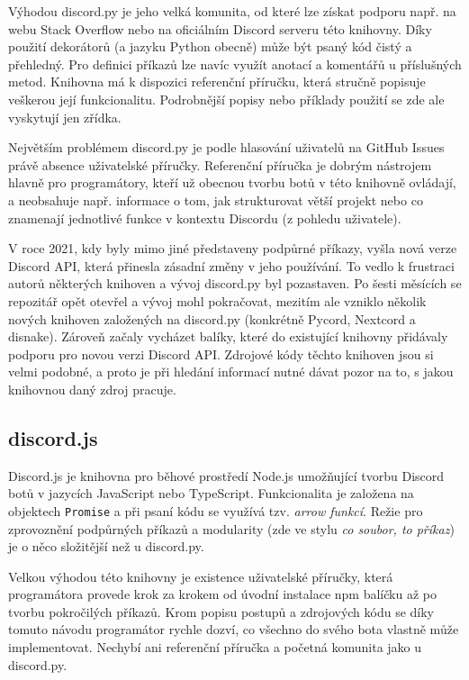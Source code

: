 \documentclass[FM]{tulthesis}
\begin{document}
	Výhodou discord.py je jeho velká komunita, od které lze získat podporu např. na webu Stack Overflow nebo na oficiálním Discord serveru této knihovny. Díky použití dekorátorů (a jazyku Python obecně) může být psaný kód čistý a přehledný. Pro definici příkazů lze navíc využít anotací a komentářů u příslušných metod. Knihovna má k dispozici referenční příručku, která stručně popisuje veškerou její funkcionalitu. Podrobnější popisy nebo příklady použití se zde ale vyskytují jen zřídka.
	
	Největším problémem discord.py je podle hlasování uživatelů na GitHub \mbox{Issues} právě absence uživatelské příručky. Referenční příručka je dobrým nástrojem hlavně pro programátory, kteří už obecnou tvorbu botů v této knihovně ovládají, a neobsahuje např. informace o tom, jak strukturovat větší projekt nebo co znamenají jednotlivé funkce v kontextu Discordu (z pohledu uživatele).
	
	V roce 2021, kdy byly mimo jiné představeny podpůrné příkazy, vyšla nová verze Discord API, která přinesla zásadní změny v jeho používání. To vedlo k frustraci autorů některých knihoven a vývoj discord.py byl pozastaven. Po šesti měsících se repozitář opět otevřel a vývoj mohl pokračovat, mezitím ale vzniklo několik nových knihoven založených na discord.py (konkrétně Pycord, Nextcord a disnake). Zároveň začaly vycházet balíky, které do existující knihovny přidávaly podporu pro novou verzi Discord API. Zdrojové kódy těchto knihoven jsou si velmi podobné, a proto je při hledání informací nutné dávat pozor na to, s jakou knihovnou daný zdroj pracuje.
	
	\subsection{discord.js}
	
	Discord.js je knihovna pro běhové prostředí Node.js umožňující tvorbu Discord botů v jazycích JavaScript nebo TypeScript. Funkcionalita je založena na objektech \verb*|Promise| a při psaní kódu se využívá tzv. \textit{arrow funkcí}. Režie pro zprovoznění podpůrných příkazů a modularity (zde ve stylu \textit{co soubor, to příkaz}) je o něco složitější než u discord.py.
	
	Velkou výhodou této knihovny je existence uživatelské příručky, která programátora provede krok za krokem od úvodní instalace npm balíčku až po tvorbu pokročilých příkazů. Krom popisu postupů a zdrojových kódu se díky tomuto návodu programátor rychle dozví, co všechno do svého bota vlastně může implementovat. Nechybí ani referenční příručka a početná komunita jako u discord.py.
	
\end{document}
